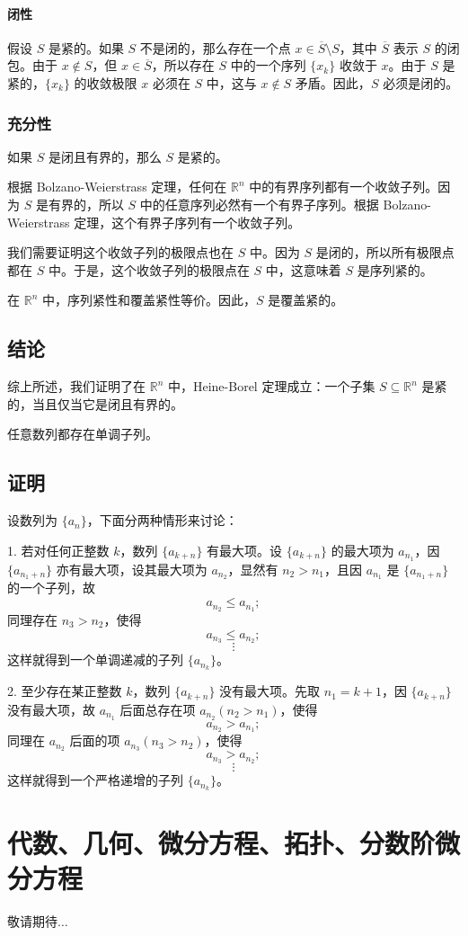 \documentclass[lang=cn,newtx,10pt,scheme=chinese]{elegantbook}
\begin{document}
\subsubsection*{闭性}
假设 $S$ 是紧的。如果 $S$ 不是闭的，那么存在一个点 $x \in \overline{S} \setminus S$，其中 $\overline{S}$ 表示 $S$ 的闭包。由于 $x \notin S$，但 $x \in \overline{S}$，所以存在 $S$ 中的一个序列 $\{x_k\}$ 收敛于 $x$。由于 $S$ 是紧的，$\{x_k\}$ 的收敛极限 $x$ 必须在 $S$ 中，这与 $x \notin S$ 矛盾。因此，$S$ 必须是闭的。

\subsection*{充分性}
如果 $S$ 是闭且有界的，那么 $S$ 是紧的。

根据 Bolzano-Weierstrass 定理，任何在 $\mathbb{R}^n$ 中的有界序列都有一个收敛子列。因为 $S$ 是有界的，所以 $S$ 中的任意序列必然有一个有界子序列。根据 Bolzano-Weierstrass 定理，这个有界子序列有一个收敛子列。

我们需要证明这个收敛子列的极限点也在 $S$ 中。因为 $S$ 是闭的，所以所有极限点都在 $S$ 中。于是，这个收敛子列的极限点在 $S$ 中，这意味着 $S$ 是序列紧的。

在 $\mathbb{R}^n$ 中，序列紧性和覆盖紧性等价。因此，$S$ 是覆盖紧的。

\section*{结论}
综上所述，我们证明了在 $\mathbb{R}^n$ 中，Heine-Borel 定理成立：一个子集 $S \subseteq \mathbb{R}^n$ 是紧的，当且仅当它是闭且有界的。


\newpage

任意数列都存在单调子列。

\section*{证明}
设数列为 $\{a_n\}$，下面分两种情形来讨论：

1. 若对任何正整数 $k$，数列 $\{a_{k+n}\}$ 有最大项。设 $\{a_{k+n}\}$ 的最大项为 $a_{n_1}$，因 $\{a_{n_1+n}\}$ 亦有最大项，设其最大项为 $a_{n_2}$，显然有 $n_2 > n_1$，且因 $a_{n_1}$ 是 $\{a_{n_1+n}\}$ 的一个子列，故
   \[
   a_{n_2} \leq a_{n_1};
   \]
   同理存在 $n_3 > n_2$，使得
   \[
   a_{n_3} \leq a_{n_2};
   \]
   \[
   \vdots
   \]
   这样就得到一个单调递减的子列 $\{a_{n_k}\}$。

2. 至少存在某正整数 $k$，数列 $\{a_{k+n}\}$ 没有最大项。先取 $n_1 = k+1$，因 $\{a_{k+n}\}$ 没有最大项，故 $a_{n_1}$ 后面总存在项 $a_{n_2} (n_2 > n_1)$，使得
   \[
   a_{n_2} > a_{n_1};
   \]
   同理在 $a_{n_2}$ 后面的项 $a_{n_3} (n_3 > n_2)$，使得
   \[
   a_{n_3} > a_{n_2};
   \]
   \[
   \vdots
   \]
   这样就得到一个严格递增的子列 $\{a_{n_k}\}$。

\chapter{代数、几何、微分方程、拓扑、分数阶微分方程}

敬请期待$\ldots$
\end{document}
